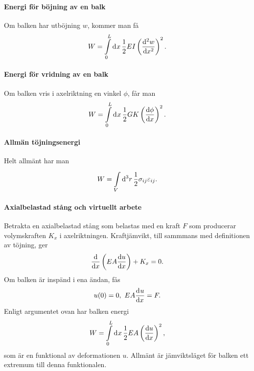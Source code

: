 \paragraph{Energi för böjning av en balk}
Om balken har utböjning $w$, kommer man få
\begin{align*}
	W = \integ{0}{L}{x}{\frac{1}{2}EI\left(\dv[2]{w}{x}\right)^{2}}.
\end{align*}

\paragraph{Energi för vridning av en balk}
Om balken vris i axelriktning en vinkel $\phi$, får man
\begin{align*}
	W = \integ{0}{L}{x}{\frac{1}{2}GK\left(\dv{\phi}{x}\right)^{2}}.
\end{align*}

\paragraph{Allmän töjningsenergi}
Helt allmänt har man
\begin{align*}
	W = \integ[3]{V}{}{r}{\frac{1}{2}\sigma_{ij}\varepsilon_{ij}}.
\end{align*}

\paragraph{Axialbelastad stång och virtuellt arbete}
Betrakta en axialbelastad stång som belastas med en kraft $F$ som producerar volymskraften $K_{x}$ i axelriktningen. Kraftjämvikt, till sammmans med definitionen av töjning, ger
\begin{align*}
	\dv{x}\left(EA\dv{u}{x}\right) + K_{x} = 0.
\end{align*}
Om balken är inspänd i ena ändan, fås
\begin{align*}
	u(0) = 0,\ EA\deval{u}{x}{L} = F.
\end{align*}
Enligt argumentet ovan har balken energi
\begin{align*}
	W = \integ{0}{L}{x}{\frac{1}{2}EA\left(\dv{u}{x}\right)^{2}},
\end{align*}
som är en funktional av deformationen $u$. Allmänt är jämviktsläget för balken ett extremum till denna funktionalen.

